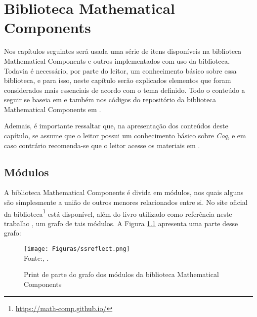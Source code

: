 \chapter{Biblioteca Mathematical Components}
\label{cap:mathcomp}

Nos capítulos seguintes será usada uma série de itens disponíveis na biblioteca Mathematical Components e outros implementados com uso da biblioteca. Todavia é necessário, por parte do leitor, um conhecimento básico sobre essa biblioteca, e para isso, neste capítulo serão explicados elementos que foram considerados mais essenciais de acordo com o tema definido. Todo o conteúdo a seguir se baseia em \cite{assia_mahboubi_2022_7118596} e também nos códigos do repositório da biblioteca Mathematical Components em \cite{mathcomp-github}.

Ademais, é importante ressaltar que, na apresentação dos conteúdos deste capítulo, se assume que o leitor possui um conhecimento básico sobre \textit{Coq}, e em caso contrário recomenda-se que o leitor acesse os materiais em \cite{logical-foundations}.

\section{Módulos}
A biblioteca Mathematical Components é divida em módulos, nos quais alguns são simplesmente a união de outros menores relacionados entre si. No site oficial da biblioteca\footnote{\url{https://math-comp.github.io/}} está disponível, além do livro utilizado como referência neste trabalho \cite{assia_mahboubi_2022_7118596}, um grafo
de tais módulos. A Figura \ref{fig:graph-mathcomp} apresenta uma parte desse grafo:

\begin{figure}[h]
    \centering
    \caption{Print de parte do grafo dos módulos da biblioteca Mathematical Components}
    \texttt{[image: Figuras/ssreflect.png]}\\
    \footnotesize{Fonte:\citeauthor{grafo-ssreflect}, \citeyear{grafo-ssreflect}.
    }
    \label{fig:graph-mathcomp}
\end{figure}


